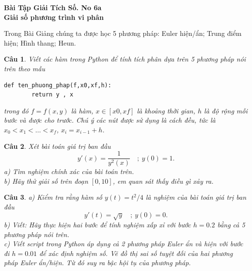 \documentclass[11pt]{article}
\newtheorem{bt}{Câu}
\begin{document}



\begin{center}
	{\bf Bài Tập Giải Tích Số. No 6a \\ Giải số phương trình vi phân}
\end{center}

Trong Bài Giảng chúng ta được học 5 phương pháp: Euler hiện/ẩn; Trung điểm hiện; Hình thang; Heun.


\begin{bt} Viết các hàm trong Python để tính tích phân dựa trên 5 phương pháp nói trên theo mẫu 
	\begin{lstlisting}[frame=single] 
		def ten_phuong_phap(f,x0,xf,h):
		return y , x
	\end{lstlisting}
	trong đó $f = f(x,y)$ là hàm, $x \in [x0,xf]$ là khoảng thời gian, $h$ là độ rộng mỗi bước và được cho trước. Chú ý các nút được sử dụng là cách đều, tức là $x_0<x_1<\dots<x_f$, $x_i = x_{i-1} + h$. 
\end{bt}

	
\begin{bt}
Xét bài toán giá trị ban đầu
%
\begin{equation*}
	y'(x) = \dfrac{1}{y^2(x)} \quad ; \  y(0) = 1. 
\end{equation*}
%
a) Tìm nghiệm chính xác của bài toán trên. \\
b) Hãy thử giải số trên đoạn $[0,10]$, em quan sát thấy điều gì xảy ra. 
\end{bt}

\begin{bt}
a) Kiểm tra rằng hàm số $y(t) = t^2/4$ là nghiệm của bài toán giá trị ban đầu
\begin{equation*}
y'(t) = \sqrt{y} \quad ; \  y(0) = 0. 
\end{equation*}
b) Viết: Hãy thực hiện hai bước để tính nghiệm xấp xỉ với bước $h = 0.2$ bằng cả 5 phương pháp nói trên. \\
c) Viết script trong Python áp dụng cả 2 phương pháp Euler ẩn và hiện với bước đi $h = 0.01$ để xác định nghiệm số. Vẽ đồ thị sai số tuyệt đối của hai phương pháp Euler ẩn/hiện. 
Từ đó suy ra bậc hội tụ của phương pháp.
\end{bt}
\end{document}

